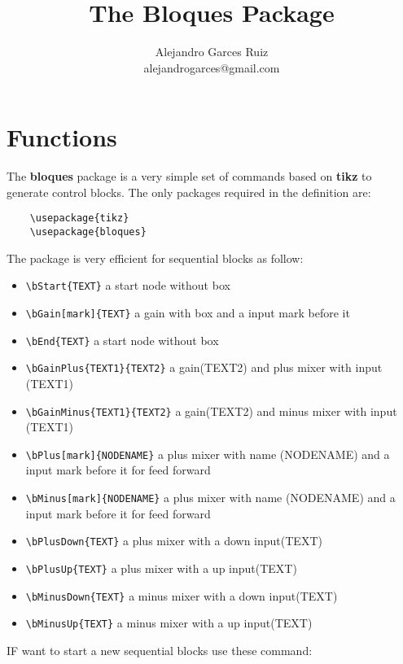 \documentclass[a4paper,onecolumn]{IEEETran}
\title{The Bloques Package}
\author{Alejandro Garces Ruiz \\ alejandrogarces@gmail.com}
\begin{document}
\maketitle

\section{Functions}


The \textbf{bloques} package is a very simple set of commands based on \textbf{tikz} to generate control blocks.  The only packages required in the definition are:

\begin{verbatim}
	\usepackage{tikz}
	\usepackage{bloques}
\end{verbatim}

The package is very efficient for sequential blocks as follow:

\begin{itemize}
\item \verb|\bStart{TEXT}| a start node without box
\item \verb|\bGain[mark]{TEXT}| a gain with box and a input mark before it
\item \verb|\bEnd{TEXT}| a start node without box
\item \verb|\bGainPlus{TEXT1}{TEXT2}| a gain(TEXT2) and plus mixer with input (TEXT1)
\item \verb|\bGainMinus{TEXT1}{TEXT2}| a gain(TEXT2) and minus mixer with input (TEXT1)
\item \verb|\bPlus[mark]{NODENAME}| a plus mixer with name (NODENAME) and a input mark before it for feed forward
\item \verb|\bMinus[mark]{NODENAME}| a plus mixer with name (NODENAME) and a input mark before it for feed forward
\item \verb|\bPlusDown{TEXT}| a plus mixer with a down input(TEXT)
\item \verb|\bPlusUp{TEXT}|   a plus mixer with a up input(TEXT)
\item \verb|\bMinusDown{TEXT}| a minus mixer with a down input(TEXT)
\item \verb|\bMinusUp{TEXT}| a minus mixer with a up input(TEXT)
\end{itemize}

IF want to start a new sequential blocks use these command:
\end{document}
